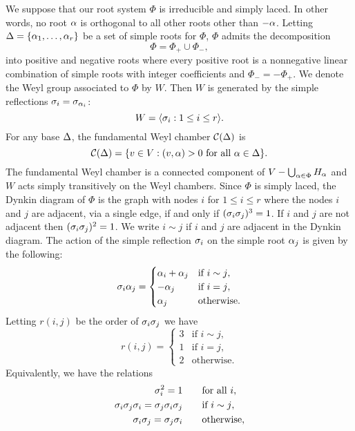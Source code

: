 \documentclass[12pt,reqno,oneside]{amsart}
\begin{document}
        We suppose that our root system $\Phi$ is irreducible and simply laced. In other words, no root $\alpha$ is orthogonal to all other roots other than $-\alpha$. Letting $\Delta = \{\alpha_{1},\ldots,\alpha_{r}\}$ be a set of simple roots for $\Phi$, $\Phi$ admits the decomposition
        \[
            \Phi = \Phi_{+} \cup \Phi_{-},
        \]
        into positive and negative roots where every positive root is a nonnegative linear combination of simple roots with integer coefficients and $\Phi_{-} = -\Phi_{+}$. We denote the Weyl group associated to $\Phi$ by $W$. Then $W$ is generated by the simple reflections $\sigma_{i} = \sigma_{\alpha_{i}}$:
        \[
            W = \langle\sigma_{i}:1 \le i \le r\rangle.
        \]
        For any base $\Delta$, the fundamental Weyl chamber $\mathcal{C}(\Delta)$ is
        \[
            \mathcal{C}(\Delta) = \{v \in V:(v,\alpha) > 0 \text{ for all } \alpha \in \Delta\}.
        \]
        The fundamental Weyl chamber is a connected component of $V-\bigcup_{\alpha \in \Phi}H_{\alpha}$ and $W$ acts simply transitively on the Weyl chambers. Since $\Phi$ is simply laced, the Dynkin diagram of $\Phi$ is the graph with nodes $i$ for $1 \le i \le r$ where the nodes $i$ and $j$ are adjacent, via a single edge, if and only if $(\sigma_{i}\sigma_{j})^{3} = 1$. If $i$ and $j$ are not adjacent then $(\sigma_{i}\sigma_{j})^{2} = 1$. We write $i \sim j$ if $i$ and $j$ are adjacent in the Dynkin diagram. The action of the simple reflection $\sigma_{i}$ on the simple root $\alpha_{j}$ is given by the following:
        \[
            \sigma_{i}\alpha_{j} = \begin{cases} \alpha_{i}+\alpha_{j} & \text{if $i \sim j$}, \\ -\alpha_{j} & \text{if $i = j$}, \\ \alpha_{j} & \text{otherwise}. \end{cases}
        \]
        Letting $r(i,j)$ be the order of $\sigma_{i}\sigma_{j}$ we have
        \[
            r(i,j) = \begin{cases} 3 & \text{if $i \sim j$}, \\ 1 & \text{if $i = j$}, \\ 2 & \text{otherwise}. \end{cases}
        \]
        Equivalently, we have the relations
        \begin{align*}
            \sigma_{i}^{2} = 1 \qquad &\text{for all $i$}, \\
            \sigma_{i}\sigma_{j}\sigma_{i} = \sigma_{j}\sigma_{i}\sigma_{j} \qquad &\text{if $i \sim j$}, \\
            \sigma_{i}\sigma_{j} = \sigma_{j}\sigma_{i} \qquad &\text{otherwise},
        \end{align*}
\end{document}
